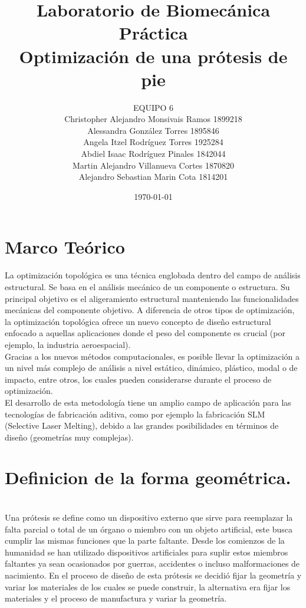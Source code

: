 \documentclass{article}
\author{EQUIPO 6\\Christopher Alejandro Monsivais Ramos   1899218\\
Alessandra González Torres  1895846\\
Angela Itzel Rodríguez Torres   1925284\\
Abdiel Isaac Rodríguez Pinales  1842044\\
Martin Alejandro Villanueva Cortes  1870820\\
Alejandro Sebastian Marin Cota  1814201} %
\title{Laboratorio de Biomecánica\\Pr\'{a}ctica \\Optimizaci\'{o}n de una pr\'{o}tesis de pie} %
\date{\today}
\begin{document}

\maketitle %

\section{Marco Te\'{o}rico}\label{intro} %
La optimización topológica es una técnica englobada dentro del campo de análisis estructural. Se basa en el análisis mecánico de un componente o estructura. Su principal objetivo es el aligeramiento estructural manteniendo las funcionalidades mecánicas del componente objetivo. A diferencia de otros tipos de optimización, la optimización topológica ofrece un nuevo concepto de diseño estructural enfocado a aquellas aplicaciones donde el peso del componente es crucial (por ejemplo, la industria aeroespacial).
\\
Gracias a los nuevos métodos computacionales, es posible llevar la optimización a un nivel más complejo de análisis a nivel estático, dinámico, plástico, modal o de impacto, entre otros, los cuales pueden considerarse durante el proceso de optimización.
\\
El desarrollo de esta metodología tiene un amplio campo de aplicación para las tecnologías de fabricación aditiva, como por ejemplo la fabricación SLM (Selective Laser Melting), debido a las grandes posibilidades en términos de diseño (geometrías muy complejas).\cite{ff2}

\section{Definicion de la forma geométrica.}\label{intro} %
\\
Una prótesis se define como un dispositivo externo que sirve para reemplazar la falta parcial o total de un órgano o miembro con un objeto artificial, este busca cumplir las mismas funciones que la parte faltante. Desde los comienzos de la humanidad se han utilizado dispositivos artificiales para suplir estos miembros faltantes ya sean ocasionados por guerras, accidentes o incluso malformaciones de nacimiento. En el proceso de diseño de esta prótesis se decidió fijar la geometría y variar los materiales de los cuales se puede construir, la alternativa era fijar los materiales y el proceso de manufactura y variar la geometría.
\\
\end{document}

